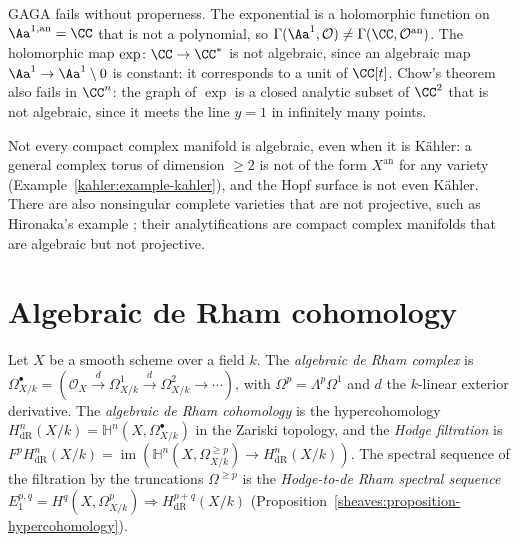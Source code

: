 \begin{counterexample}\label{gaga:counterexample-non-proper}
GAGA fails without properness. The exponential is a holomorphic function on $\Aa^{1,\mathrm{an}} = \CC$ that is not a polynomial, so
$\Gamma(\Aa^1, \mathcal{O}) \neq \Gamma(\CC, \mathcal{O}^{\mathrm{an}})$. The holomorphic map $\exp \colon \CC \to \CC^*$ is not algebraic, since an algebraic map $\Aa^1 \to \Aa^1 \setminus 0$
is constant: it corresponds to a unit of $\CC[t]$. Chow's theorem also fails in $\CC^n$: the graph of $\exp$ is a closed analytic subset of $\CC^2$ that is not algebraic,
since it meets the line $y = 1$ in infinitely many points.
\end{counterexample}

\begin{counterexample}\label{gaga:counterexample-non-algebraic}
Not every compact complex manifold is algebraic, even when it is K\"ahler: a general complex torus of dimension $\geq 2$ is not of the form $X^{\mathrm{an}}$ for any
variety (Example~\ref{kahler:example-kahler}), and the Hopf surface is not even K\"ahler. There are also nonsingular complete varieties that are not projective,
such as Hironaka's example \cite[Appendix B, Example 3.4.1]{hartshorne-ag}; their analytifications are compact complex manifolds that are algebraic but not
projective.
\end{counterexample}

\section{Algebraic de Rham cohomology}\label{gaga:section-de-rham}

\begin{definition}\label{gaga:definition-algebraic-de-rham}
Let $X$ be a smooth scheme over a field $k$. The \emph{algebraic de Rham complex} is $\Omega^\bullet_{X/k} = (\mathcal{O}_X \xrightarrow{d} \Omega^1_{X/k} \xrightarrow{d} \Omega^2_{X/k} \to \cdots)$, with
$\Omega^p = \Lambda^p\Omega^1$ and $d$ the $k$-linear exterior derivative. The \emph{algebraic de Rham cohomology} is the hypercohomology
$H^n_{\mathrm{dR}}(X/k) = \mathbb{H}^n(X, \Omega^\bullet_{X/k})$ in the Zariski topology, and the \emph{Hodge filtration} is
$F^pH^n_{\mathrm{dR}}(X/k) = \operatorname{im}\left(\mathbb{H}^n(X, \Omega^{\geq p}_{X/k}) \to H^n_{\mathrm{dR}}(X/k)\right)$. The spectral sequence of the filtration by the
truncations $\Omega^{\geq p}$ is the \emph{Hodge-to-de Rham spectral sequence} $E_1^{p,q} = H^q(X, \Omega^p_{X/k}) \Rightarrow H^{p+q}_{\mathrm{dR}}(X/k)$
(Proposition~\ref{sheaves:proposition-hypercohomology}).
\end{definition}

